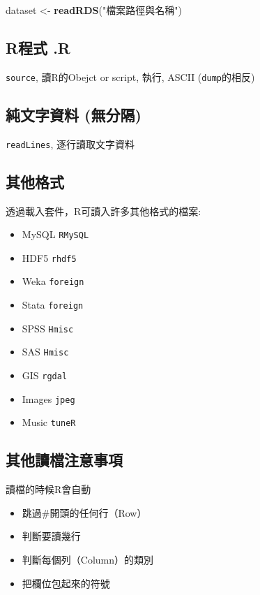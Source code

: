 \documentclass[]{book}
\newenvironment{Shaded}{\begin{snugshade}}{\end{snugshade}}
\newcommand{\KeywordTok}[1]{\textcolor[rgb]{0.13,0.29,0.53}{\textbf{{#1}}}}
\newcommand{\StringTok}[1]{\textcolor[rgb]{0.31,0.60,0.02}{{#1}}}
\newcommand{\NormalTok}[1]{{#1}}
\providecommand{\tightlist}{%
  \setlength{\itemsep}{0pt}\setlength{\parskip}{0pt}}
\theoremstyle{definition}
\theoremstyle{definition}
\theoremstyle{remark}
\begin{document}
\begin{Shaded}
\begin{Highlighting}[]
\NormalTok{dataset <-}\StringTok{ }\KeywordTok{readRDS}\NormalTok{(}\StringTok{"檔案路徑與名稱"}\NormalTok{)}
\end{Highlighting}
\end{Shaded}

\subsection{R程式 .R}\label{r-.r}

\texttt{source}, 讀R的Obejct or script, 執行, ASCII
(\texttt{dump}的相反)

\subsection{純文字資料 (無分隔)}\label{-}

\texttt{readLines}, 逐行讀取文字資料

\subsection{其他格式}

透過載入套件，R可讀入許多其他格式的檔案:

\begin{itemize}
\tightlist
\item
  MySQL \texttt{RMySQL}
\item
  HDF5 \texttt{rhdf5}
\item
  Weka \texttt{foreign}
\item
  Stata \texttt{foreign}
\item
  SPSS \texttt{Hmisc}
\item
  SAS \texttt{Hmisc}
\item
  GIS \texttt{rgdal}
\item
  Images \texttt{jpeg}
\item
  Music \texttt{tuneR}
\end{itemize}

\subsection{其他讀檔注意事項}

讀檔的時候R會自動

\begin{itemize}
\tightlist
\item
  跳過\#開頭的任何行（Row）
\item
  判斷要讀幾行
\item
  判斷每個列（Column）的類別
\item
  把欄位包起來的符號
\end{itemize}
\end{document}
